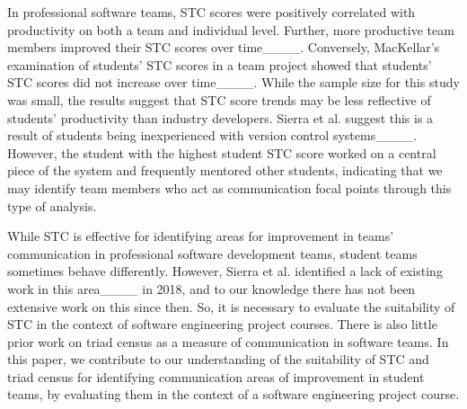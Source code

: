 In professional software teams, STC scores were positively correlated with productivity on both a team and individual level. Further, more productive team members  improved their STC scores over time____. Conversely, MacKellar's examination of students' STC scores in a team project showed that students' STC scores did not increase over time____. While the sample size for this study was small, the results suggest that STC score trends may be less reflective of students' productivity than industry developers. Sierra et al. suggest this is a result of students being inexperienced with version control systems____. However, the student with the highest student STC score worked on a central piece of the system and frequently mentored other students, indicating that we may identify team members who act as communication focal points through this type of analysis.



While STC is effective for identifying areas for improvement in teams' communication in professional software development teams, student teams sometimes behave differently. However, Sierra et al. identified a lack of existing work in this area____ in 2018, and to our knowledge there has not been extensive work on this since then. So, it is necessary to evaluate the suitability of STC in the context of software engineering project courses. There is also little prior work on triad census as a measure of communication in software teams. In this paper, we contribute to our understanding of the suitability of STC and triad census for identifying communication areas of improvement in student teams, by evaluating them in the context of a software engineering project course.


